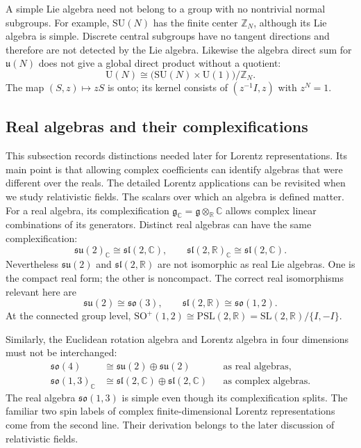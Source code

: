 \documentclass[11pt]{article}
\newcommand{\R}{\mathbb{R}}
\newcommand{\SO}{\mathrm{SO}}
\newcommand{\C}{\mathbb C}
\newcommand{\Z}{\mathbb Z}
\newcommand{\SU}{\mathrm{SU}}
\newcommand{\UU}{\mathrm{U}}
\newcommand{\SL}{\mathrm{SL}}
\newcommand{\lieg}{\mathfrak g}
\newcommand{\su}{\mathfrak{su}}
\newcommand{\so}{\mathfrak{so}}
\newcommand{\slie}{\mathfrak{sl}}
\begin{document}
A simple Lie algebra need not belong to a group with no nontrivial
normal subgroups. For example, \(\SU(N)\) has the finite center
\(\Z_N\), although its Lie algebra is simple. Discrete central
subgroups have no tangent directions and therefore are not detected by
the Lie algebra. Likewise the algebra direct sum for \(\mathfrak u(N)\)
does not give a global direct product without a quotient:
\[
 \UU(N)\cong\bigl(\SU(N)\times\UU(1)\bigr)/\Z_N.
\]
The map \((S,z)\mapsto zS\) is onto; its kernel consists of
\((z^{-1}I,z)\) with \(z^N=1\).

\subsection{Real algebras and their complexifications}
This subsection records distinctions needed later for Lorentz
representations. Its main point is that allowing complex coefficients
can identify algebras that were different over the reals. The detailed
Lorentz applications can be revisited when we study relativistic fields.
The scalars over which an algebra is defined matter. For a real algebra,
its complexification \(\lieg_{\C}=\lieg\otimes_{\R}\C\) allows complex
linear combinations of its generators. Distinct real algebras can have
the same complexification:
\begin{equation}
 \su(2)_{\C}\cong\slie(2,\C),\qquad
 \slie(2,\R)_{\C}\cong\slie(2,\C).
 \label{eq:real-forms}
\end{equation}
Nevertheless \(\su(2)\) and \(\slie(2,\R)\) are not isomorphic as real
Lie algebras. One is the compact real form; the other is noncompact.
The correct real isomorphisms relevant here are
\[
 \su(2)\cong\so(3),\qquad
 \slie(2,\R)\cong\so(1,2).
\]
At the connected group level,
\(\SO^+(1,2)\cong\mathrm{PSL}(2,\R)
=\SL(2,\R)/\{I,-I\}\).

Similarly, the Euclidean rotation algebra and Lorentz algebra in four
dimensions must not be interchanged:
\begin{align}
 \so(4)&\cong\su(2)\oplus\su(2)
 &&\text{as real algebras},\\
 \so(1,3)_{\C}&\cong\slie(2,\C)\oplus\slie(2,\C)
 &&\text{as complex algebras}.
 \label{eq:lorentz-complexification}
\end{align}
The real algebra \(\so(1,3)\) is simple even though its
complexification splits. The familiar two spin labels of complex
finite-dimensional Lorentz representations come from the second line.
Their derivation belongs to the later discussion of relativistic fields.
\end{document}
